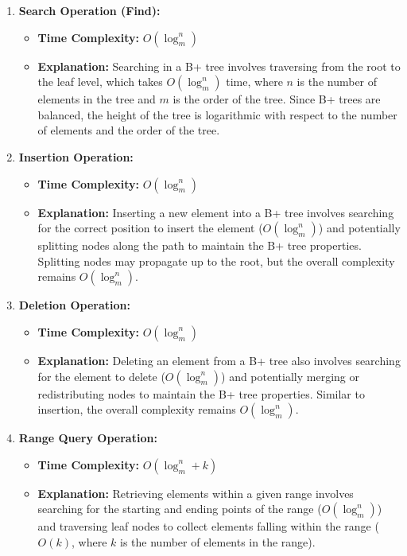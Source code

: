 \documentclass{article}
\begin{document}
\begin{enumerate}
    \item \textbf{Search Operation (Find):}
    \begin{itemize}
        \item \textbf{Time Complexity:} \(O(\log_{m}^{n})\)
        \item \textbf{Explanation:} Searching in a B+ tree involves traversing from the root to the leaf level, which takes \(O(\log_{m}^{n})\) time, where \(n\) is the number of elements in the tree and \(m\) is the order of the tree. Since B+ trees are balanced, the height of the tree is logarithmic with respect to the number of elements and the order of the tree.
    \end{itemize}
    
    \item \textbf{Insertion Operation:}
    \begin{itemize}
        \item \textbf{Time Complexity:} \(O(\log_{m}^{n})\)
        \item \textbf{Explanation:} Inserting a new element into a B+ tree involves searching for the correct position to insert the element (\(O(\log_{m}^{n})\)) and potentially splitting nodes along the path to maintain the B+ tree properties. Splitting nodes may propagate up to the root, but the overall complexity remains \(O(\log_{m}^{n})\).
    \end{itemize}
    
    \item \textbf{Deletion Operation:}
    \begin{itemize}
        \item \textbf{Time Complexity:} \(O(\log_{m}^{n})\)
        \item \textbf{Explanation:} Deleting an element from a B+ tree also involves searching for the element to delete (\(O(\log_{m}^{n})\)) and potentially merging or redistributing nodes to maintain the B+ tree properties. Similar to insertion, the overall complexity remains \(O(\log_{m}^{n})\).
    \end{itemize}
    
    \item \textbf{Range Query Operation:}
    \begin{itemize}
        \item \textbf{Time Complexity:} \(O(\log_{m}^{n} + k)\)
        \item \textbf{Explanation:} Retrieving elements within a given range involves searching for the starting and ending points of the range (\(O(\log_{m}^{n})\)) and traversing leaf nodes to collect elements falling within the range (\(O(k)\), where \(k\) is the number of elements in the range).
    \end{itemize}
    

\end{enumerate}
\end{document}
